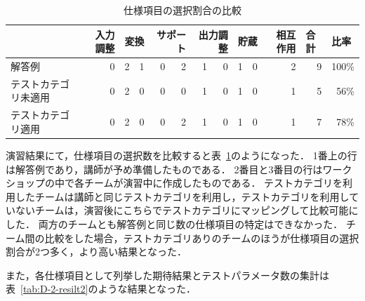 \begin{table}[htbp]
  \centering
  \caption{仕様項目の選択割合の比較}
    \begin{tabular}{|l|r|r|r|r|r|r|r|r|r|r|r|r|}
    \hline
          & \multicolumn{1}{p{2em}|}{入力調整} & \multicolumn{2}{c|}{変換} & \multicolumn{2}{p{3em}|}{サポート} & \multicolumn{2}{p{2em}|}{出力調整} & \multicolumn{2}{c|}{貯蔵} & \multicolumn{1}{p{2em}|}{相互作用} & \multicolumn{1}{l|}{\textbf{合計}} & \multicolumn{1}{l|}{\textbf{比率}} \bigstrut\\
    \hline
    解答例   & 0     & 2     & 1     & 0     & 2     & 1     & 0     & 1     & 0     & 2     & 9     & 100\% \bigstrut\\
    \cline{1-13}
    \multicolumn{1}{|p{7em}|}{テストカテゴリ未適用}  & 0     & 2     & 0     & 0     & 0     & 1     & 0     & 1     & 0     & 1     & 5     & 56\% \bigstrut\\
    \cline{1-13}
    \multicolumn{1}{|p{7em}|}{テストカテゴリ適用}  & 0     & 2     & 0     & 0     & 2     & 1     & 0     & 1     & 0     & 1     & 7     & 78\% \bigstrut\\
    \hline
    \end{tabular}%
  \label{tab:addlabel6}%
\end{table}%

演習結果にて，仕様項目の選択数を比較すると表~\ref{tab:addlabel6}のようになった．
1番上の行は解答例であり，講師が予め準備したものである．
2番目と3番目の行はワークショップの中で各チームが演習中に作成したものである．
テストカテゴリを利用したチームは講師と同じテストカテゴリを利用し，テストカテゴリを利用していないチームは，演習後にこちらでテストカテゴリにマッピングして比較可能にした．
両方のチームとも解答例と同じ数の仕様項目の特定はできなかった．
チーム間の比較をした場合，テストカテゴリありのチームのほうが仕様項目の選択割合が2つ多く，より高い結果となった．

また，各仕様項目として列挙した期待結果とテストパラメータ数の集計は表~\ref{tab:D-2-resilt2}のような結果となった．

